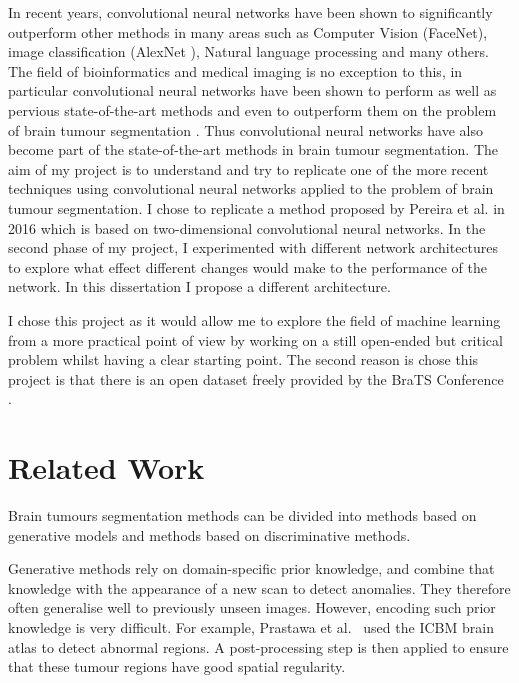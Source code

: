 \documentclass[12pt,a4paper,twoside,openright]{report}
\begin{document}
In recent years, convolutional neural networks have been shown to significantly outperform other methods in many areas such as Computer Vision (FaceNet\cite{face_net}), image classification (AlexNet \cite{alex_net}), Natural language processing \cite{nlp_deep_learning} and many others. The field of bioinformatics and medical imaging is no exception to this, in particular convolutional neural networks have been shown to perform as well as pervious state-of-the-art methods and even to outperform them on the problem of brain tumour segmentation \cite{pereira} \cite{brats_cnn_with_crf}. Thus convolutional neural networks have also become part of the state-of-the-art methods in brain tumour segmentation. The aim of my project is to understand and try to replicate one of the more recent techniques using convolutional neural networks applied to the problem of brain tumour segmentation. I chose to replicate a method proposed by Pereira et al.\cite{pereira} in 2016 which is based on two-dimensional convolutional neural networks. In the second phase of my project, I experimented with different network architectures to explore what effect different changes would make to the performance of the network. In this dissertation I propose a different architecture.

I chose this project as it would allow me to explore the field of machine learning from a more practical point of view by working on a still open-ended but critical problem whilst having a clear starting point. The second reason is chose this project is that there is an open dataset freely provided by the BraTS Conference \cite{brats-proceedings}.

\section{Related Work}
Brain tumours segmentation methods can be divided into methods based on generative models and methods based on discriminative methods.

Generative methods rely on domain-specific prior knowledge, and combine that knowledge with the appearance of a new scan to detect anomalies. They therefore often generalise well to previously unseen images. However, encoding such prior knowledge is very difficult. For example, Prastawa et al.\ \cite{prastawa} used the ICBM brain atlas to detect abnormal regions. A post-processing step is then applied to ensure that these tumour regions have good spatial regularity.
\end{document}
